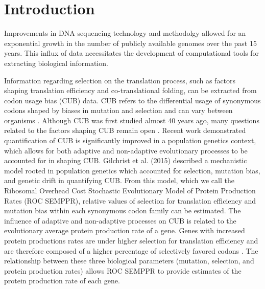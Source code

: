 \documentclass{bioinfo}
\begin{document}
\section*{Introduction}
Improvements in DNA sequencing technology and methodolgy allowed for an exponential growth in the number of publicly available genomes over the past 15 years.
This influx of data necessitates the development of computational tools for extracting biological information.

Information regarding selection on the translation process, such as factors shaping translation efficiency and co-translational folding, can be extracted from codon usage bias (CUB) data.
CUB refers to the differential usage of synonymous codons shaped by biases in mutation and selection and can vary between organisms \citep{bulmer1991, sharp1993}.
Although CUB was first studied almost 40 years ago, many questions related to the factors shaping CUB remain open \citep{shah2011, wallace2013, gilchrist2015}.
Recent work demonstrated quantification of CUB is significantly improved in a population genetics context, which allows for both adaptive and non-adaptive evolutionary processes to be accounted for in shaping CUB.
Gilchrist et al. (2015) described a mechanistic model rooted in population genetics which accounted for selection, mutation bias, and genetic drift in quantifying CUB. 
From this model, which we call the Ribosomal Overhead Cost Stochastic Evolutionary Model of Protein Production Rates (ROC SEMPPR), relative values of selection for translation efficiency and mutation bias within each synonymous codon family can be estimated. 
The influence of adaptive and non-adaptive processes on CUB is related to the evolutionary average protein production rate of a gene. Genes with increased protein productions rates are under higher selection for translation efficiency and are therefore composed of a higher percentage of selectively favored codons \citep{shah2011, wallace2013, gilchrist2015}. The relationship between these three biological parameters (mutation, selection, and protein production rates) allows ROC SEMPPR to provide estimates of the protein production rate of each gene.
\end{document}
